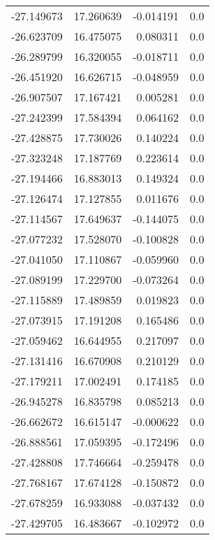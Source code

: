 \begin{tabular}{rrrr}
      -27.149673 &        17.260639 &   -0.014191 &   0.0 \\
      -26.623709 &        16.475075 &    0.080311 &   0.0 \\
      -26.289799 &        16.320055 &   -0.018711 &   0.0 \\
      -26.451920 &        16.626715 &   -0.048959 &   0.0 \\
      -26.907507 &        17.167421 &    0.005281 &   0.0 \\
      -27.242399 &        17.584394 &    0.064162 &   0.0 \\
      -27.428875 &        17.730026 &    0.140224 &   0.0 \\
      -27.323248 &        17.187769 &    0.223614 &   0.0 \\
      -27.194466 &        16.883013 &    0.149324 &   0.0 \\
      -27.126474 &        17.127855 &    0.011676 &   0.0 \\
      -27.114567 &        17.649637 &   -0.144075 &   0.0 \\
      -27.077232 &        17.528070 &   -0.100828 &   0.0 \\
      -27.041050 &        17.110867 &   -0.059960 &   0.0 \\
      -27.089199 &        17.229700 &   -0.073264 &   0.0 \\
      -27.115889 &        17.489859 &    0.019823 &   0.0 \\
      -27.073915 &        17.191208 &    0.165486 &   0.0 \\
      -27.059462 &        16.644955 &    0.217097 &   0.0 \\
      -27.131416 &        16.670908 &    0.210129 &   0.0 \\
      -27.179211 &        17.002491 &    0.174185 &   0.0 \\
      -26.945278 &        16.835798 &    0.085213 &   0.0 \\
      -26.662672 &        16.615147 &   -0.000622 &   0.0 \\
      -26.888561 &        17.059395 &   -0.172496 &   0.0 \\
      -27.428808 &        17.746664 &   -0.259478 &   0.0 \\
      -27.768167 &        17.674128 &   -0.150872 &   0.0 \\
      -27.678259 &        16.933088 &   -0.037432 &   0.0 \\
      -27.429705 &        16.483667 &   -0.102972 &   0.0 \\

\end{tabular}
